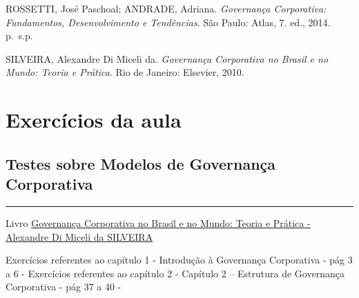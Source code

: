 \documentclass[
]{book}
\begin{document}
ROSSETTI, José Paschoal; ANDRADE, Adriana. \emph{Governança Corporativa: Fundamentos, Desenvolvimento e Tendências}. São Paulo: Atlas, 7. ed., 2014. p.~s.p.

SILVEIRA, Alexandre Di Miceli da. \emph{Governança Corporativa no Brasil e no Mundo: Teoria e Prática}. Rio de Janeiro: Elsevier, 2010.

\section{Exercícios da aula}\label{exercuxedcios-da-aula}

\subsection{Testes sobre Modelos de Governança Corporativa}\label{testes-sobre-modelos-de-governanuxe7a-corporativa}

\begin{center}\rule{0.5\linewidth}{0.5pt}\end{center}

Livro \href{https://pdfcoffee.com/governana-corporativa-no-brasil-e-no-mundo-pdf-free.html}{Governança Corporativa no Brasil e no Mundo: Teoria e Prática - Alexandre Di Miceli da SILVEIRA}

Exercícios referentes ao capítulo 1 - Introdução à Governança Corporativa - pág 3 a 6 - Exercícios referentes ao capítulo 2 - Capítulo 2 -- Estrutura de Governança Corporativa - pág 37 a 40 -
\end{document}
